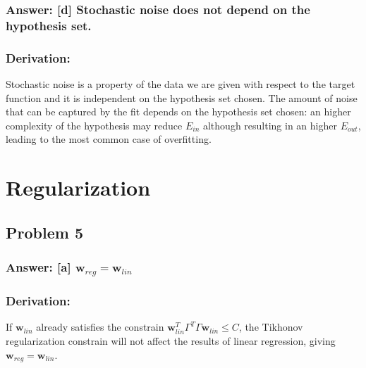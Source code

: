 \documentclass[11pt]{article}
\begin{document}
\hypertarget{answer-d-stochastic-noise-does-not-depend-on-the-hypothesis-set.}{%
\subsubsection{Answer: {[}d{]} Stochastic noise does not depend on the
hypothesis
set.}\label{answer-d-stochastic-noise-does-not-depend-on-the-hypothesis-set.}}

\hypertarget{derivation}{%
\subsubsection{Derivation:}\label{derivation}}

Stochastic noise is a property of the data we are given with respect to
the target function and it is independent on the hypothesis set chosen.
The amount of noise that can be captured by the fit depends on the
hypothesis set chosen: an higher complexity of the hypothesis may reduce
\(E_{in}\) although resulting in an higher \(E_{out}\), leading to the
most common case of overfitting.

    \hypertarget{regularization}{%
\section{Regularization}\label{regularization}}

\hypertarget{problem-5}{%
\subsection{Problem 5}\label{problem-5}}

\hypertarget{answer-a-mathbfw_regmathbfw_lin}{%
\subsubsection{\texorpdfstring{Answer: {[}a{]}
\(\mathbf{w}_{reg}=\mathbf{w}_{lin}\)}{Answer: {[}a{]} \textbackslash{}mathbf\{w\}\_\{reg\}=\textbackslash{}mathbf\{w\}\_\{lin\}}}\label{answer-a-mathbfw_regmathbfw_lin}}

\hypertarget{derivation}{%
\subsubsection{Derivation:}\label{derivation}}

If \(\mathbf{w}_{lin}\) already satisfies the constrain
\(\mathbf{w}_{lin}^T\Gamma^T\Gamma\mathbf{w}_{lin}\le C\), the Tikhonov
regularization constrain will not affect the results of linear
regression, giving \(\mathbf{w}_{reg}=\mathbf{w}_{lin}\).
\end{document}
